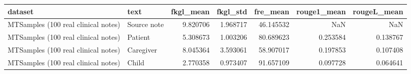 \begin{tabular}{llrrrrr}
\toprule
dataset & text & fkgl\_mean & fkgl\_std & fre\_mean & rouge1\_mean & rougeL\_mean \\
\midrule
MTSamples (100 real clinical notes) & Source note & 9.820706 & 1.968717 & 46.145532 & NaN & NaN \\
MTSamples (100 real clinical notes) & Patient & 5.308673 & 1.003206 & 80.689623 & 0.253584 & 0.138767 \\
MTSamples (100 real clinical notes) & Caregiver & 8.045364 & 3.593061 & 58.907017 & 0.197853 & 0.107408 \\
MTSamples (100 real clinical notes) & Child & 2.770358 & 0.973407 & 91.657109 & 0.097728 & 0.064641 \\
\bottomrule
\end{tabular}

